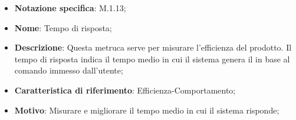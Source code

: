 \begin{itemize}
    \item \textbf{Notazione specifica}: M.1.13;
    \item \textbf{Nome}: Tempo di risposta;
    \item \textbf{Descrizione}: Questa metruca serve per misurare l’efficienza del prodotto. Il tempo di risposta indica il tempo medio in cui il sistema genera il  in base al comando immesso dall’utente;
    \item \textbf{Caratteristica di riferimento}: Efficienza-Comportamento;
    \item \textbf{Motivo}: Misurare e migliorare il tempo medio in cui il sistema risponde;
\end{itemize}

